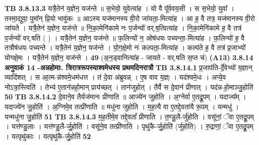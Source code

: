 \documentclass[17pt]{extarticle}
\begin{document}
{{{{{{{{{{{{{{{{{{{{{{                  \newline
                                \textbf{ TB 3.8.13.3} \newline
                  यत्रै॒तेन॑ य॒ज्ञेन॒ यज॑न्ते ॥ स॒भेयो॒ युवेत्या॑ह । यो वै पू᳚र्ववय॒सी । स स॒भेयो॒ युवा᳚ । तस्मा॒द्युवा॒ पुमा᳚न् प्रि॒यो भावु॑कः ॥ आऽस्य यज॑मानस्य वी॒रो जा॑यता॒-मित्या॑ह । आ ह॒ वै तत्र॒ यज॑मानस्य वी॒रो जा॑यते । यत्रै॒तेन॑ य॒ज्ञेन॒ यज॑न्ते ॥ नि॒का॒मेनि॑कामे नः प॒र्जन्यो॑ वर्.ष॒त्वित्या॑ह । नि॒का॒मेनि॑कामे ह॒ वै तत्र॑ प॒र्जन्यो॑ वर्.षति ( ) । यत्रै॒तेन॑ य॒ज्ञेन॒ यज॑न्ते ॥ फ॒लिन्यो॑ न॒ ओष॑धयः पच्यन्ता॒-मित्या॑ह । फ॒लिन्यो॑ ह॒ वै तत्रौष॑धयः पच्यन्ते । यत्रै॒तेन॑ य॒ज्ञेन॒ यज॑न्ते । यो॒ग॒क्षे॒मो नः॑ कल्पता॒-मित्या॑ह । कल्प॑ते ह॒ वै तत्र॑ प्र॒जाभ्यो॑ योगक्षे॒मः । यत्रै॒तेन॑ य॒ज्ञेन॒ यज॑न्ते । \textbf{ 49} \newline
                  \newline
                                    (अ॒न॒ड्वानित्या॑ह - जायते - वर्.षति स॒प्त च॑) \textbf{(A13)} \newline \newline
                \textbf{ 3.8.14    अनुवाकं   14 -अन्नहोमाः. त्रिरात्ररूपस्याश्वमेधस्य प्रथमदिनरात्रौ} \newline
                                \textbf{ TB 3.8.14.1} \newline
                  प्र॒जाप॑ति-र्दे॒वेभ्यो॑ य॒ज्ञान् व्यादि॑शत् । स आ॒त्म-न्न॑श्वमे॒धम॑धत्त । तं दे॒वा अ॑ब्रुवन्न् । ए॒ष वाव य॒ज्ञ्ः । यद॑श्वमे॒धः । अप्ये॒व नोऽत्रा॒स्त्विति॑ । तेभ्य॑ ए॒तान॑न्नहो॒मान् प्राय॑च्छत् । तान॑जुहोत् । तैर्वै स दे॒वान॑ प्रीणात् । यद॑न्न-हो॒माञ्जु॒होति॑ \textbf{ 50} \newline
                  \newline
                                \textbf{ TB 3.8.14.2} \newline
                  दे॒वाने॒व तैर्यज॑मानः प्रीणाति ॥ आज्ये॑न जुहोति । अ॒ग्नेर्वा ए॒तद्रू॒पम् । यदाज्य᳚म् । यदाज्ये॑न जु॒होति॑ । अ॒ग्निमे॒व तत्प्री॑णाति ॥ मधु॑ना जुहोति । म॒ह॒त्यै वा ए॒तद्दे॒वता॑यै रू॒पम् । यन्मधु॑ । यन्मधु॑ना जु॒होति॑ \textbf{ 51} \newline
                  \newline
                                \textbf{ TB 3.8.14.3} \newline
                  म॒ह॒तीमे॒व तद्दे॒वतां᳚ प्रीणाति । त॒ण्डु॒लै-र्जु॑होति । वसू॑नां॒ ॅवा ए॒तद्रू॒पम् । यत्त॑ण्डु॒लाः । यत्त॑ण्डु॒लै-र्जु॒होति॑ । वसू॑ने॒व तत्प्री॑णाति । पृथु॑कै-र्जु॒होति॑ (र्जुहोति) । रु॒द्राणां॒ ॅवा ए॒तद्रू॒पम् । यत्पृथु॑काः । यत्पृथु॑कै-र्जु॒होति॑ \textbf{ 52} \newline
}}}}}}}}}}}}}}}}}}}}}}
\end{document}

